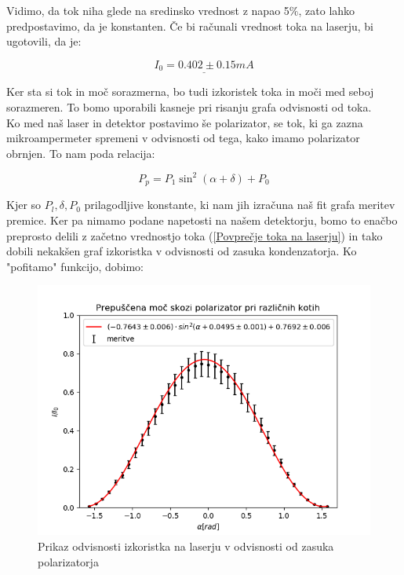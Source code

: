 \documentclass[11pt, a4paper]{article}
\theoremstyle{definition}
\theoremstyle{example}
\theoremstyle{izrek}
\begin{document}
Vidimo, da tok niha glede na sredinsko vrednost z napao 5$\%$, zato lahko predpostavimo, da je konstanten. Če bi računali vrednost toka na laserju, bi ugotovili, da je: 


\begin{equation}
	\underline{I_0=0.402 \pm 0.15 mA} 
	\label{Povprečje toka na laserju}
\end{equation}

Ker sta si tok in moč sorazmerna, bo tudi izkoristek toka in moči med seboj sorazmeren. To bomo uporabili kasneje pri risanju grafa odvisnosti od toka. \\

Ko med naš laser in detektor postavimo še polarizator, se tok, ki ga zazna mikroampermeter spremeni v odvisnosti od tega, kako imamo polarizator obrnjen. To nam poda relacija: 

\begin{equation}
\label{Moč na diodi, en polarizator}
P_p=P_1\sin^2(\alpha + \delta )+P_0
\end{equation}

Kjer so $P_l, \delta, P_0$ prilagodljive konstante, ki nam jih izračuna naš fit grafa meritev premice.
Ker pa nimamo podane napetosti na našem detektorju, bomo to enačbo preprosto delili z začetno vrednostjo toka (\ref{Povprečje toka na laserju}) in tako dobili nekakšen graf izkoristka v odvisnosti od zasuka kondenzatorja.
Ko "pofitamo" funkcijo, dobimo:

\begin{figure}[H]
	\centering
    \includegraphics[width=12cm]{Izkoristek_kot,1_polarizator.png}
    \caption{Prikaz odvisnosti izkoristka na laserju v odvisnosti od zasuka polarizatorja}
\end{figure}
\end{document}
